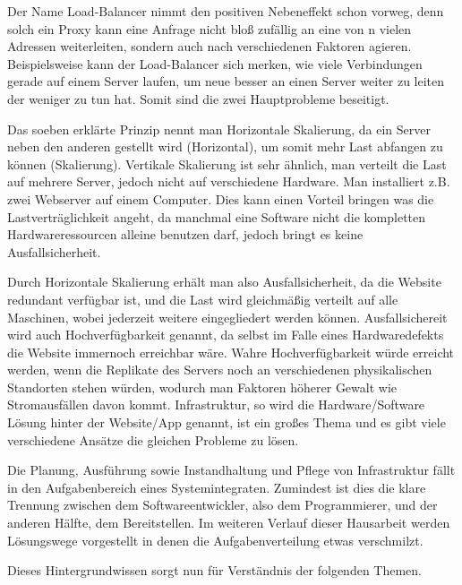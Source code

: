Der Name Load-Balancer nimmt den positiven Nebeneffekt schon vorweg, denn solch ein Proxy kann eine Anfrage nicht bloß zufällig an eine von n vielen Adressen weiterleiten, sondern auch nach verschiedenen Faktoren agieren.
Beispielsweise kann der Load-Balancer sich merken, wie viele Verbindungen gerade auf einem Server laufen, um neue besser an einen Server weiter zu leiten der weniger zu tun hat. Somit sind die zwei Hauptprobleme beseitigt.

Das soeben erklärte Prinzip nennt man Horizontale Skalierung, da ein Server neben den anderen gestellt wird (Horizontal), um somit mehr Last abfangen zu können (Skalierung).
Vertikale Skalierung ist sehr ähnlich, man verteilt die Last auf mehrere Server, jedoch nicht auf verschiedene Hardware. Man installiert z.B. zwei Webserver auf einem Computer. 
Dies kann einen Vorteil bringen was die Lastverträglichkeit angeht, da manchmal eine Software nicht die kompletten Hardwareressourcen alleine benutzen darf, jedoch bringt es keine Ausfallsicherheit.

Durch Horizontale Skalierung erhält man also Ausfallsicherheit, da die Website redundant verfügbar ist, und die Last wird gleichmäßig verteilt auf alle Maschinen, wobei jederzeit weitere eingegliedert werden können.
Ausfallsichereit wird auch Hochverfügbarkeit genannt, da selbst im Falle eines Hardwaredefekts die Website immernoch erreichbar wäre. Wahre Hochverfügbarkeit würde erreicht werden, wenn die Replikate des Servers noch
an verschiedenen physikalischen Standorten stehen würden, wodurch man Faktoren höherer Gewalt wie Stromausfällen davon kommt. Infrastruktur, so wird die Hardware/Software Lösung hinter der Website/App genannt, ist ein großes
Thema und es gibt viele verschiedene Ansätze die gleichen Probleme zu lösen.

Die Planung, Ausführung sowie Instandhaltung und Pflege von Infrastruktur fällt in den Aufgabenbereich eines Systemintegraten. Zumindest ist dies die klare Trennung zwischen 
dem Softwareentwickler, also dem Programmierer, und der anderen Hälfte, dem Bereitstellen. Im weiteren Verlauf dieser Hausarbeit werden Lösungswege vorgestellt in denen die Aufgabenverteilung etwas verschmilzt.

Dieses Hintergrundwissen sorgt nun für Verständnis der folgenden Themen. 